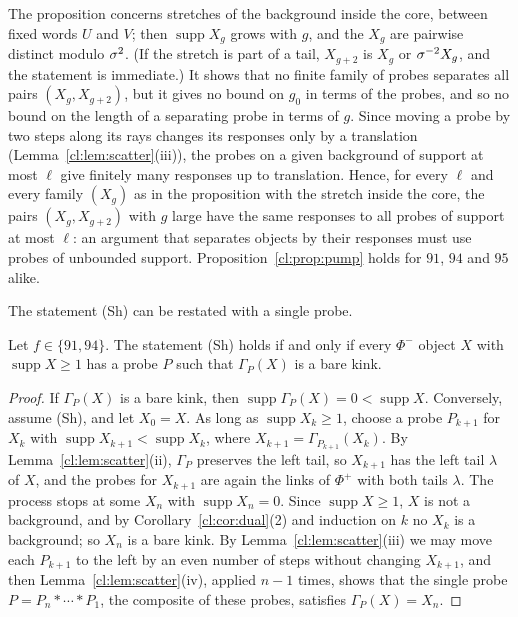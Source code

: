 The proposition concerns stretches of the background inside the core, between fixed words $U$ and $V$; then $\operatorname{supp}X_g$ grows with $g$, and the $X_g$ are pairwise distinct modulo $\sigma^2$. (If the stretch is part of a tail, $X_{g+2}$ is $X_g$ or $\sigma^{-2}X_g$, and the statement is immediate.) It shows that no finite family of probes separates all pairs $(X_g,X_{g+2})$, but it gives no bound on $g_0$ in terms of the probes, and so no bound on the length of a separating probe in terms of $g$. Since moving a probe by two steps along its rays changes its responses only by a translation (Lemma~\ref{cl:lem:scatter}(iii)), the probes on a given background of support at most $\ell$ give finitely many responses up to translation. Hence, for every $\ell$ and every family $(X_g)$ as in the proposition with the stretch inside the core, the pairs $(X_g,X_{g+2})$ with $g$ large have the same responses to all probes of support at most $\ell$: an argument that separates objects by their responses must use probes of unbounded support. Proposition~\ref{cl:prop:pump} holds for $91$, $94$ and $95$ alike.

The statement (Sh) can be restated with a single probe.

\begin{corollary}\label{cl:cor:Sh1}
Let $f\in\{91,94\}$. The statement (Sh) holds if and only if every $\Phi^-$ object $X$ with $\operatorname{supp}X\ge1$ has a probe $P$ such that $\Gamma_P(X)$ is a bare kink.
\end{corollary}

\begin{proof}
If $\Gamma_P(X)$ is a bare kink, then $\operatorname{supp}\Gamma_P(X)=0<\operatorname{supp}X$. Conversely, assume (Sh), and let $X_0=X$. As long as $\operatorname{supp}X_k\ge1$, choose a probe $P_{k+1}$ for $X_k$ with $\operatorname{supp}X_{k+1}<\operatorname{supp}X_k$, where $X_{k+1}=\Gamma_{P_{k+1}}(X_k)$. By Lemma~\ref{cl:lem:scatter}(ii), $\Gamma_P$ preserves the left tail, so $X_{k+1}$ has the left tail $\lambda$ of $X$, and the probes for $X_{k+1}$ are again the links of $\Phi^+$ with both tails $\lambda$. The process stops at some $X_n$ with $\operatorname{supp}X_n=0$. Since $\operatorname{supp}X\ge1$, $X$ is not a background, and by Corollary~\ref{cl:cor:dual}(2) and induction on $k$ no $X_k$ is a background; so $X_n$ is a bare kink. By Lemma~\ref{cl:lem:scatter}(iii) we may move each $P_{k+1}$ to the left by an even number of steps without changing $X_{k+1}$, and then Lemma~\ref{cl:lem:scatter}(iv), applied $n-1$ times, shows that the single probe $P=P_n*\cdots*P_1$, the composite of these probes, satisfies $\Gamma_P(X)=X_n$.
\end{proof}
